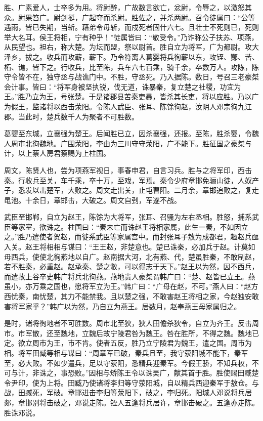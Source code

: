 \documentclass[]{article}
\begin{document}
胜、广素爱人，士卒多为用。将尉醉，广故数言欲亡，忿尉，令辱之，以激怒其众。尉果笞广。尉剑挺，广起夺而杀尉。胜佐之，并杀两尉。召令徒属曰：``公等遇雨，皆已失期，当斩。藉弟令毋斩，而戍死者固什六七。且壮士不死则已，死则举大名耳。侯王将相，宁有种乎！''徒属皆曰：``敬受令。''乃诈称公子扶苏、项燕，从民望也。袒右，称大楚。为坛而盟，祭以尉首。胜自立为将军，广为都尉。攻大泽乡，拔之。收兵而攻蕲，蕲下。乃令符离人葛婴将兵徇蕲以东，攻铚、酂、苦、柘、谯，皆下之。行收兵，比至陈，兵车六七百乘，骑千余，卒数万人。攻陈，陈守令皆不在，独守丞与战谯门中。不胜，守丞死。乃入据陈。数日，号召三老豪桀会计事。皆曰：``将军身被坚执锐，伐无道，诛暴秦，复立楚之社稷，功宜为王。''胜乃立为王，号张楚。于是诸郡县苦秦吏暴，皆杀其长吏，将以应胜。乃以广为假王，监诸将以西击荥阳。令陈人武臣、张耳、陈馀徇赵，汝阴人邓宗徇九江郡。当此时，楚兵数千人为聚者不可胜数。

葛婴至东城，立襄强为楚王。后闻胜已立，因杀襄强，还报。至陈，胜杀婴，令魏人周市北徇魏地。广围荥阳，李由为三川守守荥阳，广不能下。胜征国之豪桀与计，以上蔡人房君蔡赐为上柱国。

周文，陈贤人也，尝为项燕军视日，事春申君，自言习兵。胜与之将军印，西击秦。行收兵至关，车千乘，卒十万，至戏，军焉。秦令少府章邯免骊山徒，人奴产子，悉发以击楚军，大败之。周文走出关，止屯曹阳。二月余，章邯追败之，复走黾池。十余日，章邯击，大破之。周文自刭，军遂不战。

武臣至邯郸，自立为赵王，陈馀为大将军，张耳、召骚为左右丞相。胜怒，捕系武臣等家室，欲诛之。柱国曰：``秦未亡而诛赵王将相家属，此生一秦，不如因立之。''胜乃遣使者贺赵，而徙系武臣等家属宫中。而封张耳子敖为成都君，趣赵兵亟入关。赵王将相相与谋曰：``王王赵，非楚意也。楚已诛秦，必加兵于赵。计莫如毋西兵，使使北徇燕地以自广。赵南据大河，北有燕、代，楚虽胜秦，不敢制赵，若不胜秦，必重赵。赵承秦、楚之敝，可以得志于天下。''赵王以为然，因不西兵，而遣故上谷卒史韩广将兵北徇燕。燕地贵人豪桀谓韩广曰：``楚、赵皆已立王。燕虽小，亦万乘之国也，愿将军立为王。''韩广曰：``广母在赵，不可。''燕人曰：``赵方西忧秦，南忧楚，其力不能禁我。且以楚之强，不敢害赵王将相之家，今赵独安敢害将军家乎？''韩广以为然，乃自立为燕王。居数月，赵奉燕王母家属归之。

是时，诸将徇地者不可胜数。周市北至狄，狄人田儋杀狄令，自立为齐王。反击周市。市军散，还至魏地，立魏后故宁陵君咎为魏王。咎在胜所，不得之魏。魏地已定。欲立周市为王，市不肯。使者五反，胜乃立宁陵君为魏王，遣之国。周市为相。将军田臧等相与谋曰：``周章军已破，秦兵且至，我守荥阳城不能下，秦军至，必大败。不如少遣兵，足以守荥阳，悉精兵迎秦军。今假王骄，不知兵权，不可与计，非诛之，事恐败。''因相与矫陈王令以诛吴广，献其首于胜。胜使赐田臧楚令尹印，使为上将。田臧乃使诸将李归等守荥阳城，自以精兵西迎秦军于敖仓。与战，田臧死，军破。章邯进击李归等荥阳下，破之，李归死。阳城人邓说将兵居郯，章邯别将击破之，邓说走陈。铚人五逢将兵居许，章邯击破之。五逢亦走陈。胜诛邓说。
\end{document}
